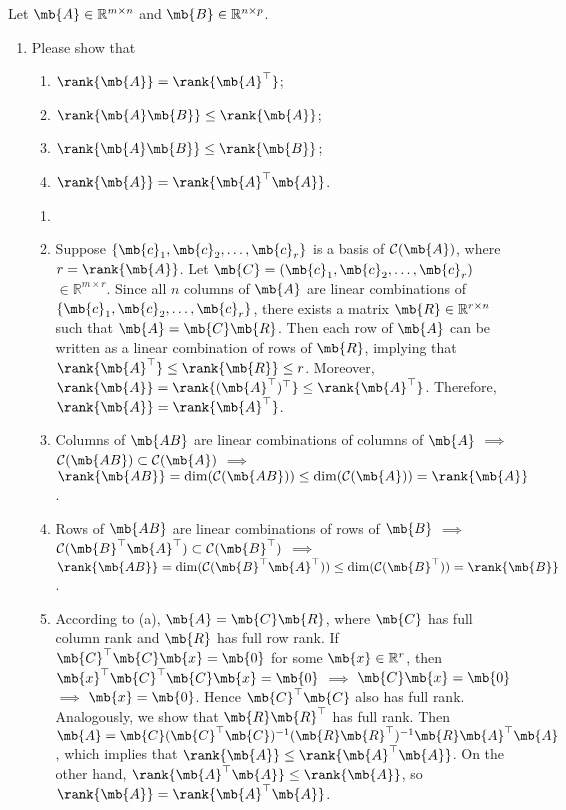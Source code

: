 \newpage
\begin{exercise}
	Let $\mb{A} \in \mathbb{R}^{m\times n}$ and $\mb{B}\in \mathbb{R}^{n\times p}$.
	\begin{enumerate}
		\item Please show that
			\begin{enumerate}
				\item $\rank{\mb{A}} = \rank{\mb{A}^{\top}}$;
				\item $\rank{\mb{A}\mb{B}} \leq \rank{\mb{A}}$;
				\item $\rank{\mb{A}\mb{B}} \leq \rank{\mb{B}}$;
				\item $\rank{\mb{A}} = \rank{\mb{A}^{\top}  \mb{A}}$.
			\end{enumerate}

			\begin{solution}
				\begin{enumerate}
					\item []
					\item Suppose $\{ \mb{c}_1, \mb{c}_2, \dots, \mb{c}_r \}$ is a basis of $\mathcal{C}(\mb{A})$, where $r=\rank{\mb{A}}$. Let $\mb{C}=(\mb{c}_1, \mb{c}_2, \dots, \mb{c}_r) $ $\in \mathbb{R}^{m\times r}$. Since all $n$ columns of $\mb{A}$ are linear combinations of $\{ \mb{c}_1, \mb{c}_2, \dots, \mb{c}_r \}$, there exists a matrix $\mb{R}\in \mathbb{R}^{r\times n}$ such that $\mb{A}=\mb{C}\mb{R}$. Then each row of $\mb{A}$ can be written as a linear combination of rows of $\mb{R}$, implying that $\rank {\mb{A}^\top} \leq \rank {\mb{R}} \leq r$. Moreover, $\rank{\mb{A}} = \rank{(\mb{A}^\top)^\top} \leq \rank{\mb{A}^\top}$. Therefore, $\rank{\mb{A}} = \rank{\mb{A}^{\top}}$.
					\item Columns of $\mb{AB}$ are linear combinations of columns of $\mb{A}$ $\implies$ $\mathcal{C}(\mb{AB}) \subset \mathcal{C}(\mb{A})$ $\implies$ $\rank{\mb{AB}} = \dim (\mathcal{C}( \mb{AB} ))\leq \dim (\mathcal{C}( \mb{A} )) = \rank{\mb{A}}$.
					\item Rows of $\mb{AB}$ are linear combinations of rows of $\mb{B}$ $\implies$ $\mathcal{C}(\mb{B}^\top \mb{A}^\top) \subset \mathcal{C}(\mb{B}^\top)$ $\implies$ $\rank{\mb{AB}} = \dim (\mathcal{C}(\mb{B}^\top \mb{A}^\top))\leq \dim (\mathcal{C}(\mb{B}^\top)) = \rank{\mb{B}}$.
					\item According to (a), $\mb{A}=\mb{C}\mb{R}$, where $\mb{C}$ has full column rank and $\mb{R}$ has full row rank. If $\mb{C}^\top\mb{C}\mb{x} = \mb{0}$ for some $\mb{x}\in \mathbb{R}^r$, then $\mb{x}^\top\mb{C}^\top\mb{C}\mb{x} = \mb{0}$ $\implies$ $\mb{C}\mb{x} = \mb{0}$ $\implies$ $\mb{x}=\mb{0}$. Hence $\mb{C}^\top\mb{C}$ also has full rank. Analogously, we show that $\mb{R}\mb{R}^\top$ has full rank. Then $\mb{A} = \mb{C} (\mb{C}^\top \mb{C})^{-1} (\mb{R} \mb{R}^\top)^{-1} \mb{R} \mb{A}^\top \mb{A}$, which implies that $\rank{\mb{A}}\leq\rank{\mb{A}^\top \mb{A}}$. On the other hand, $\rank{\mb{A}^\top \mb{A}}\leq\rank{\mb{A}}$, so $\rank{\mb{A}}=\rank{\mb{A}^\top \mb{A}}$.
						\qedhere
				\end{enumerate}
			\end{solution}


\end{enumerate}
\end{exercise}
